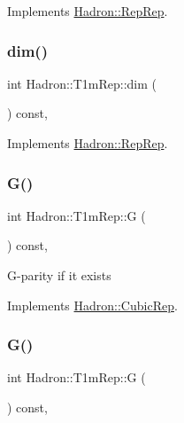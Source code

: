 Implements \mbox{\hyperlink{structHadron_1_1RepRep_a92c8802e5ed7afd7da43ccfd5b7cd92b}{Hadron\+::\+Rep\+Rep}}.

\mbox{\label{structHadron_1_1T1mRep_a6752f30731a94469c77ea15a78ddf9d9}} 
\subsubsection{\texorpdfstring{dim()}{dim()}\hspace{0.1cm}{\footnotesize\ttfamily [3/3]}}
{\footnotesize\ttfamily int Hadron\+::\+T1m\+Rep\+::dim (\begin{DoxyParamCaption}{ }\end{DoxyParamCaption}) const\hspace{0.3cm}{\ttfamily [inline]}, {\ttfamily [virtual]}}



Implements \mbox{\hyperlink{structHadron_1_1RepRep_a92c8802e5ed7afd7da43ccfd5b7cd92b}{Hadron\+::\+Rep\+Rep}}.

\mbox{\label{structHadron_1_1T1mRep_a4312f3d70845d6606406384a84d2bf14}} 
\subsubsection{\texorpdfstring{G()}{G()}\hspace{0.1cm}{\footnotesize\ttfamily [1/2]}}
{\footnotesize\ttfamily int Hadron\+::\+T1m\+Rep\+::G (\begin{DoxyParamCaption}{ }\end{DoxyParamCaption}) const\hspace{0.3cm}{\ttfamily [inline]}, {\ttfamily [virtual]}}

G-\/parity if it exists 

Implements \mbox{\hyperlink{structHadron_1_1CubicRep_a52104e43266d1614c00bbd1c3b395458}{Hadron\+::\+Cubic\+Rep}}.

\mbox{\label{structHadron_1_1T1mRep_a4312f3d70845d6606406384a84d2bf14}} 
\subsubsection{\texorpdfstring{G()}{G()}\hspace{0.1cm}{\footnotesize\ttfamily [2/2]}}
{\footnotesize\ttfamily int Hadron\+::\+T1m\+Rep\+::G (\begin{DoxyParamCaption}{ }\end{DoxyParamCaption}) const\hspace{0.3cm}{\ttfamily [inline]}, {\ttfamily [virtual]}}

